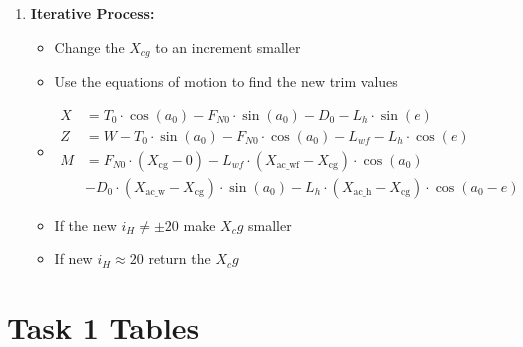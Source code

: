 \documentclass[a4paper, twoside]{article}
\begin{document}
\begin{enumerate}
    \item \textbf{Iterative Process:}
        \begin{itemize}
            \item Change the \(X_{cg}\) to an increment smaller
            \item Use the equations of motion to find the new trim values
            \item{
              \begin{equation*}
              \begin{aligned}
                  X &= T_0 \cdot \cos(a_0) - F_{N0} \cdot \sin(a_0) - D_0 - L_h \cdot \sin(e) \\
                  Z &= W - T_0 \cdot \sin(a_0) - F_{N0} \cdot \cos(a_0) - L_{wf} - L_h \cdot \cos(e) \\
                  M &= F_{N0} \cdot (X_{\text{{cg}}} - 0) - L_{wf} \cdot (X_{\text{{ac\_wf}}} - X_{\text{{cg}}})\cdot\cos(a_0) \\
                  & - D_0 \cdot (X_{\text{{ac\_w}}} - X_{\text{{cg}}}) \cdot \sin(a_0) - L_h \cdot (X_{\text{{ac\_h}}} - X_{\text{{cg}}}) \cdot \cos(a_0 - e) 
              \end{aligned}
              \end{equation*}

            }
            \item If the new \(i_H \neq \pm 20\) make \(X_cg\) smaller
            \item If new \(i_H \approx 20\) return the \(X_cg\)
        \end{itemize}
\end{enumerate}

\section{Task 1 Tables}
\end{document}

